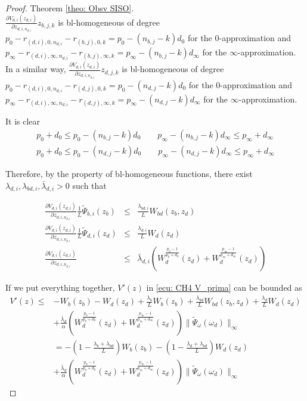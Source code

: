 \documentclass[11pt,letterpaper,twoside,openright]{report}
\providecommand{\norm}[1]{\lVert#1\rVert}
\begin{document}
\begin{proof}{Theorem \ref{theo: Obsv SISO}. \\}
	$\frac{\partial V_{d,i}(z_{d,i})}{\partial z_{d,i,n_{d,i}}}z_{b,j,k}$ is bl-homogeneous of degree $p_0-r_{(d,i),0,n_{d,i}}-r_{(b,j),0,k} =p_0-(n_{b,j}-k)d_0$ for the 0-approximation and $p_{\infty}-r_{(d,i),\infty,n_{d,i}}-r_{(b,j),\infty,k}= p_{\infty}-(n_{b,j}-k)d_{\infty}$ for the $\infty$-approximation. In a similar way, $\frac{\partial V_{d,i}(z_{d,i})}{\partial z_{d,i,n_{d,i}}}z_{d,j,k}$ is bl-homogeneous of degree $p_0-r_{(d,i),0,n_{d,i}}-r_{(d,j),0,k}=p_0-(n_{d,j}-k)d_0$ for the 0-approximation and $p_{\infty}-r_{(d,i),\infty,n_{d,i}}-r_{(d,j),\infty,k}=p_{\infty}-(n_{d,j}-k)d_{\infty}$ for the $\infty$-approximation.

	It is clear
	\begin{equation}
		\begin{split}
			p_0+d_0 \leq p_0-(n_{b,j}-k)d_0 \qquad p_{\infty}-(n_{b,j}-k)d_{\infty} \leq p_{\infty}+d_{\infty} \\
			p_0+d_0 \leq p_0-(n_{d,j}-k)d_0 \qquad p_{\infty}-(n_{d,j}-k)d_{\infty} \leq p_{\infty}+d_{\infty}
		\end{split} 
	\end{equation}
	
	Therefore, by the property of bl-homogeneous functions, there exist $\lambda_{d,i},\lambda_{bd,i},\bar{\lambda}_{d,i} > 0$ such that
	
	\begin{eqnarray}
		\frac{\partial V_{d,i}(z_{d,i})}{\partial z_{d,i,n_{d,i}}} \frac{1}{L}\tilde{\Psi}_{b,i}(z_b) &\leq & \frac{\lambda_{bd,i}}{L} W_{bd}(z_b,z_d) \\
		\frac{\partial V_{d,i}(z_{d,i})}{\partial z_{d,i,n_{d,i}}} \frac{1}{L}\tilde{\Psi}_{d,i}(z_d) &\leq & \frac{\lambda_{d,i}}{L} W_{d}(z_d) \\
		\frac{\partial V_{d,i}(z_{d,i})}{\partial z_{d,i,n_{d,i}}} &\leq & \bar{\lambda}_{d,i}\left( W_d^{\frac{p_0-1}{p_0+d_0}}(z_d) + W_d^{\frac{p_{\infty}-1}{p_{\infty}+d_{\infty}}}(z_d) \right)
	\end{eqnarray}
		

	If we put everything together, $V'(z)$ in \eqref{ecu: CH4 V_prima} can be bounded as
	\begin{equation}\label{ecu: CH4 VprimaT}
		\begin{split}
			V'(z) \leq & - W_b(z_b) - W_d(z_d) + \frac{\lambda_{b}}{L}W_b(z_b) + \frac{\lambda_{bd}}{L} W_{bd}(z_b,z_d) + \frac{\lambda_{d}}{L} W_{d}(z_d) \\
			& + \frac{\bar{\lambda}_{d}}{\alpha}\left( W_d^{\frac{p_0-1}{p_0+d_0}}(z_d) + W_d^{\frac{p_{\infty}-1}{p_{\infty}+d_{\infty}}}(z_d) \right) \norm{\tilde{\Psi}_{\omega}(\omega_d)}_{\infty} \\
			&= -\left(1- \frac{\lambda_{b}+\lambda_{bd}}{L} \right)W_b(z_b) - \left( 1- \frac{\lambda_{d}+\lambda_{bd}}{L} \right)W_{d}(z_d) \\
			& + \frac{\bar{\lambda}_{d}}{\alpha}\left( W_d^{\frac{p_0-1}{p_0+d_0}}(z_d) + W_d^{\frac{p_{\infty}-1}{p_{\infty}+d_{\infty}}}(z_d) \right) \norm{\tilde{\Psi}_{\omega}(\omega_d)}_{\infty} 
		\end{split} 
	\end{equation} 
	

\end{proof}
\end{document}
